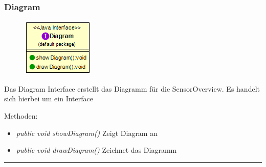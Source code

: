 \subsubsection{Diagram}
\begin{minipage}{0.3\textwidth}
    \begin{figure}[H]
        {\centering\includegraphics[scale = 0.7
        ]{media/view/diagram/Diagram_Class.png}}
    \end{figure}
    \end{minipage} \hfill
    \begin{minipage}{0.6\textwidth}
Das Diagram Interface erstellt das Diagramm für die SensorOverview. Es handelt sich hierbei um ein Interface
\end{minipage}
\vspace{\baselineskip}
Methoden: \begin{itemize} [noitemsep]
    \item \emph{public void showDiagram()} Zeigt Diagram an
    \item \emph{public void drawDiagram()} Zeichnet das Diagramm
\end{itemize}

\rule{\textwidth}{0.4pt}
